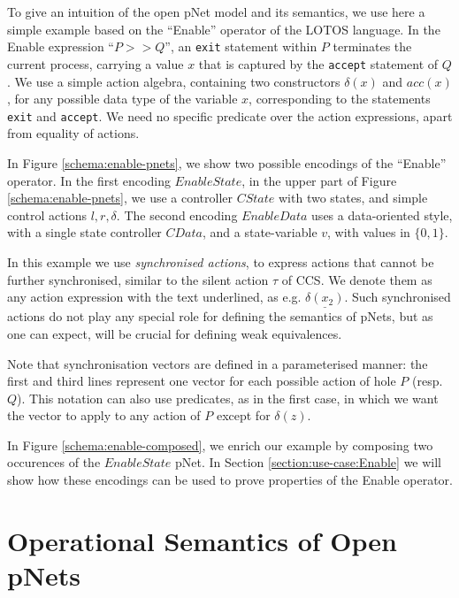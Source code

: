 \documentclass[smallcondensed]{svjour3}
\begin{document}
	To give an intuition of the open pNet model and its semantics, we use
	here a simple example based on the ``Enable'' operator of the LOTOS language.
	In the Enable expression ``$P>>Q$'', an \texttt{exit} statement within $P$
	terminates the current process, carrying a value $x$ that
	is captured by the \texttt{accept} statement of $Q$. 	
	We use a simple action algebra,
	containing two constructors $\delta(x)$ and $acc(x)$, for any
	possible data type of the variable $x$, corresponding to the
	statements \texttt{exit} and \texttt{accept}. 
	We need no specific predicate over the action expressions, apart
	from equality of actions.
        
	In Figure \ref{schema:enable-pnets}, we show two possible encodings of the  
	``Enable'' operator.
        In the first encoding $EnableState$, in the upper part of
	Figure \ref{schema:enable-pnets}, we use a controller $CState$ with two
	states, and simple control actions $l, r, \delta$. The second encoding
	$EnableData$ uses a data-oriented style, with a single state controller $CData$, and a
	state-variable $v$, with values in $\{0,1\}$.

        In this example we use \emph{synchronised
          actions}, to express actions that cannot be further synchronised, similar to the
         silent action $\tau$ of CCS. We denote them as any action expression with the text
        underlined, as e.g. $\underline{\delta(x_2)}$. Such
        synchronised actions do not play any special role for defining
        the semantics of pNets, but as one can expect, will be crucial
        for defining weak equivalences.
	
	Note that synchronisation vectors are defined in a parameterised
	manner:  the first and third lines represent one vector
	for each possible action of hole $P$
	(resp. $Q$). This notation can also use predicates, as in the first
	case, in which we want the vector to apply to any action of $P$
	except for $\delta(z)$.
	
	In Figure \ref{schema:enable-composed}, we enrich our example by
	composing two occurences of the $EnableState$ pNet. In Section
        \ref{section:use-case:Enable} we will show how these encodings can
        be used to prove properties of the Enable operator.




\section{Operational Semantics of Open pNets}
\label{section:op-semantics}
\end{document}
